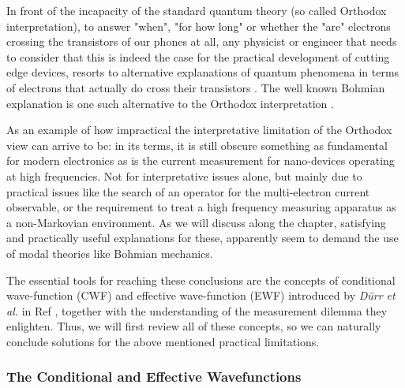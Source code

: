 \documentclass[11pt, a4paper]{article} %
\begin{document}
\newpage
{}
\setcounter{page}{1}

\hspace*{4mm} In front of the incapacity of the standard quantum theory (so called Orthodox interpretation), to answer "when", "for how long" or whether the "are" electrons crossing the transistors of our phones at all, any physicist or engineer that needs to consider that this is indeed the case for the practical development of cutting edge devices, resorts to alternative explanations of quantum phenomena in terms of electrons that actually do cross their transistors \cite{where}. The well known Bohmian explanation is one such alternative to the Orthodox interpretation \cite{Durr} \cite{JordiXavier}. 

As an example of how impractical the interpretative limitation of the Orthodox view can arrive to be: in its terms, it is still obscure something as fundamental for modern electronics as is the current measurement for nano-devices operating at high frequencies. Not for interpretative issues alone, but mainly due to practical issues like the search of an operator for the multi-electron current observable, or the requirement to treat a high frequency measuring apparatus as a non-Markovian environment. As we will discuss along the chapter, satisfying and practically useful explanations for these, apparently seem to demand the use of modal theories like Bohmian mechanics. 

The essential tools for reaching these conclusions are the concepts of conditional wave-function (CWF) and effective wave-function (EWF) introduced by {\em Dürr et al.} in Ref \cite{Absolute}, together with the understanding of the measurement dilemma they enlighten. Thus, we will first review all of these concepts, so we can naturally conclude solutions for the above mentioned practical limitations.
\vspace{-0.2cm}

\subsubsection*{The Conditional and Effective Wavefunctions}
\vspace{-0.2cm}
\end{document}
